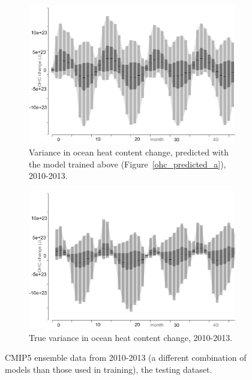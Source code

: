 \begin{figure}[h]
    \centering
    \begin{subfigure}{0.49\textwidth}
         \includegraphics[width=\textwidth]{images/sampling/2010_2014_predictions}
        \caption{Variance in ocean heat content change, predicted with the model trained above (Figure~\ref{ohc_predicted_a}), 2010-2013.}
        \label{ohc_predicted_b}
    \end{subfigure}
    \begin{subfigure}{0.49\textwidth}
        \includegraphics[width=\textwidth]{images/sampling/cmip_truth_2010-2014}
        \caption{True variance in ocean heat content change, 2010-2013.}
        \label{ohc_true_b}
    \end{subfigure}
     \caption{CMIP5 ensemble data from 2010-2013 (a different combination of models than those used in training), the testing dataset.}
     \label{ohc_b}
\end{figure}


